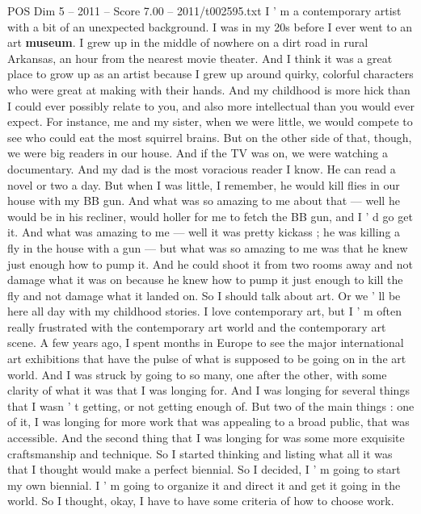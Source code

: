 \begin{textsample}{POS Dim 5 – 2011 – Score 7.00 – 2011/t002595.txt}  \label{ex:f5_pos_032}
I ' m a contemporary artist with a bit of an unexpected background.
I was in my 20s before I ever went to an art \textbf{museum}.
I grew up in the middle of nowhere on a dirt road in rural Arkansas, an hour from the nearest movie theater.
And I think it was a great place to grow up as an artist because I grew up around quirky, colorful characters who were great at making with their hands.
And my childhood is more hick than I could ever possibly relate to you, and also more intellectual than you would ever expect.
For instance, me and my sister, when we were little, we would compete to see who could eat the most squirrel brains.
But on the other side of that, though, we were big readers in our house.
And if the TV was on, we were watching a documentary.
And my dad is the most voracious reader I know.
He can read a novel or two a day.
But when I was little, I remember, he would kill flies in our house with my BB gun.
And what was so amazing to me about that — well he would be in his recliner, would holler for me to fetch the BB gun, and I ' d go get it.
And what was amazing to me — well it was pretty kickass ; he was killing a fly in the house with a gun — but what was so amazing to me was that he knew just enough how to pump it.
And he could shoot it from two rooms away and not damage what it was on because he knew how to pump it just enough to kill the fly and not damage what it landed on.
So I should talk about art.
Or we ' ll be here all day with my childhood stories.
I love contemporary art, but I ' m often really frustrated with the contemporary art world and the contemporary art scene.
A few years ago, I spent months in Europe to see the major international art exhibitions that have the pulse of what is supposed to be going on in the art world.
And I was struck by going to so many, one after the other, with some clarity of what it was that I was longing for.
And I was longing for several things that I wasn ' t getting, or not getting enough of.
But two of the main things : one of it, I was longing for more work that was appealing to a broad public, that was accessible.
And the second thing that I was longing for was some more exquisite craftsmanship and technique.
So I started thinking and listing what all it was that I thought would make a perfect biennial.
So I decided, I ' m going to start my own biennial.
I ' m going to organize it and direct it and get it going in the world.
So I thought, okay, I have to have some criteria of how to choose work.

\end{textsample}
